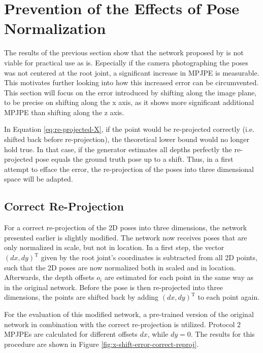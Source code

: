 \section{Prevention of the Effects of Pose Normalization}
\label{sec:network-adjusting}

The results of the previous section show that the network proposed by \citet{drover18} is not viable for practical use as is.
Especially if the camera photographing the poses was not centered at the root joint, a significant increase in MPJPE is measurable.
This motivates further looking into how this increased error can be circumvented.
This section will focus on the error introduced by shifting along the image plane, to be precise on shifting along the x axis, as it shows more significant additional MPJPE than shifting along the z axis.

In Equation \eqref{eq:re-projected-X}, if the point would be re-projected correctly (i.e. shifted back before re-projection), the theoretical lower bound would no longer hold true.
In that case, if the generator estimates all depths perfectly the re-projected pose equals the ground truth pose up to a shift.
Thus, in a first attempt to efface the error, the re-projection of the poses into three dimensional space will be adapted.

\subsection{Correct Re-Projection}

For a correct re-projection of the 2D poses into three dimensions, the network presented earlier is slightly modified.
The network now receives poses that are only normalized in scale, but not in location.
In a first step, the vector $(dx, dy)^\mathrm{T}$ given by the root joint's coordinates is subtracted from all 2D points, such that the 2D poses are now normalized both in scaled and in location.
Afterwards, the depth offsets $o_i$ are estimated for each point in the same way as in the original network.
Before the pose is then re-projected into three dimensions, the points are shifted back by adding $(dx, dy)^\mathrm{T}$ to each point again.



For the evaluation of this modified network, a pre-trained version of the original network in combination with the correct re-projection is utilized.
Protocol 2 MPJPEs are calculated for different offsets $dx$, while $dy = 0$.
The results for this procedure are shown in Figure \ref{fig:x-shift-error-correct-reproj}.

